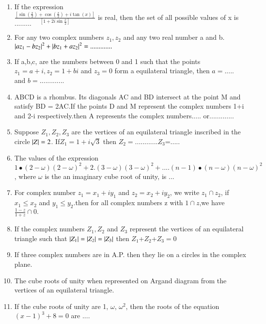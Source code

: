 \renewcommand{\theequation}{\theenumi}
\begin{enumerate}[label=\arabic*.,ref=\thesubsection.\theenumi]

	\item If the expression \\
	$\frac{[\sin(\frac{x}{2})+\cos(\frac{x}{2})+i\tan(x)]}{[1+ 2 i \sin{\frac{x}{2}}]}$
    is real, then the set of all possible values of x  is $.........$
    \item For any two complex numbers $z_1,z_2$ and any two real number a and b. 
    $\left\vert az_1-bz_2\right\vert^2 + \left\vert bz_1+az_2\right\vert^2 =.............$
    \item If a,b,c, are the numbers between 0 and 1 such that the points $z_1=a
    +i,z_2 = 1+bi$ and $z_3=0$ form a equilateral triangle, then $a=.....$ and $b=.............$
    \item ABCD is a rhombus. Its diagonals AC and BD intersect at the point M and satisfy BD = 2AC.If the points D and M represent the complex numbers 1+i and 2-i  respectively.then A represents the complex numbers$.....$ or$.............$
    \item Suppose $Z_1,Z_2,Z_3$ are the vertices of an equilateral triangle inscribed in the circle
     $\left\vert Z\right\vert = 2$. If$Z_1 = 1+i\sqrt{3}$ then $Z_2 =............Z_3$=.....
    \item The values of the expression
    $1\bullet(2-\omega)(2-\omega)^2+2.(3-\omega)(3-\omega)^2+....(n-1) \bullet(n-\omega)(n-\omega)^2$,
    where $\omega$ is the an imaginary cube root of unity, is $...$
 \item For complex number $z_1 = x_1+iy_1$ and $z_2 = x_2+iy_2$, we write $z_1\cap z_2$, if $x_1 \leq x_2$ and $y_1 \leq y_2$.then for all complex numbers z with $1\cap z$,we have ${{\frac{1-z}{1+z}}}\cap0.$
    \item If the complex numbers $Z_1,Z_2$ and $Z_3$ represent the vertices of an equilateral triangle such that  $\left\vert Z_1\right\vert = \left\vert Z_2\right\vert = \left\vert Z_3\right\vert$ then $Z_1$+$Z_2$+$Z_3 = 0$
    \item If three complex numbers are in A.P. then they lie on a circles in the complex plane.  
    \item The cube roots of unity when represented on Argand  diagram from the vertices of an equilateral triangle.
	\item If the cube roots of unity are 1, $\omega$, $\omega^2$, then the roots of the equation     
	$(x-1)^3+8=0$ are $....$
    \begin{enumerate}

\end{enumerate}
\end{enumerate}
